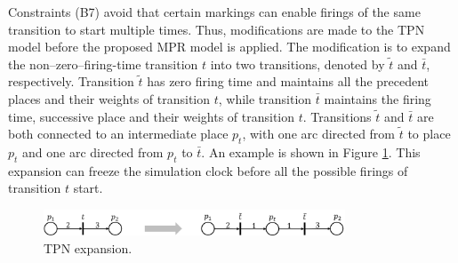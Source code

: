 \documentclass[suppldata]{interact}
\theoremstyle{plain}
\theoremstyle{definition}
\theoremstyle{remark}
\begin{document}
Constraints (B7) avoid that certain markings can enable firings of the same transition to start multiple times. Thus, modifications are made to the TPN model before the proposed MPR model is applied. The modification is to expand the non--zero--firing-time transition $t$ into two transitions, denoted by $\tilde{t}$ and $\bar{t}$, respectively. Transition $\tilde{t}$ has zero firing time and maintains all the precedent places and their weights of transition $t$, while transition $\bar{t}$ maintains the firing time, successive place and their weights of transition $t$. Transitions $\tilde{t}$ and $\bar{t}$ are both connected to an intermediate place $p_t$, %
with one arc %
directed from $\tilde{t}$ to place $p_t$ and one arc %
directed from $p_t$ to $\bar{t}$. An example is shown in Figure \ref{fig:tpn_expansion}. This expansion can freeze the simulation clock before all the possible firings of transition $t$ start.

\begin{figure}[h]
	\centering
	\includegraphics[width=0.8\textwidth]{Figures/TPN_expansion.png}
	\caption{TPN expansion.}
	\label{fig:tpn_expansion}
\end{figure}
\end{document}
